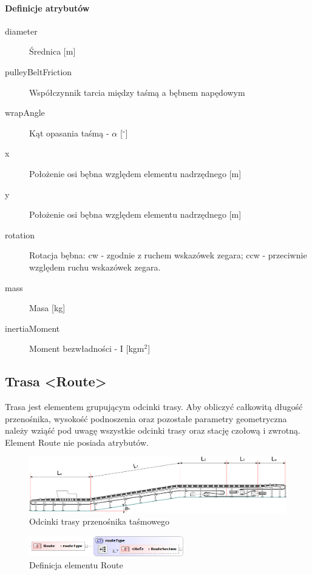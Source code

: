\documentclass[12pt,a4paper]{article}
\begin{document}
\paragraph{Definicje atrybutów}
\begin{description}
\item[diameter] Średnica [m]
\item[pulleyBeltFriction] Współczynnik tarcia między taśmą a bębnem napędowym
\item[wrapAngle] Kąt opasania taśmą - $\alpha$ [$^\circ$]
\item[x] Położenie osi bębna względem elementu nadrzędnego [m]
\item[y] Położenie osi bębna względem elementu nadrzędnego [m]
\item[rotation] Rotacja bębna: cw - zgodnie z ruchem wskazówek zegara;
	ccw - przeciwnie względem ruchu wskazówek zegara.
\item[mass] Masa [kg]
\item[inertiaMoment] Moment bezwładności - I [kgm$^2$]
\end{description}

\subsection{Trasa <Route>}
Trasa jest elementem grupującym odcinki trasy. Aby obliczyć całkowitą długość
przenośnika, wysokość podnoszenia oraz pozostałe parametry geometryczna należy
wziąść pod uwagę wszystkie odcinki trasy oraz stację czołową i zwrotną. 
Element Route nie posiada atrybutów.

\begin{figure}
  \centering
  \includegraphics[width=\textwidth]{png/belt_conveyor2_drw}
  \caption{Odcinki trasy przenośnika taśmowego}
  \label{fig:beltConveyor2-drw}
\end{figure}

\begin{figure}[h]
  \centering
  \includegraphics[width=0.6\textwidth]{png/liquid/Route}
  \caption{Definicja elementu Route}
  \label{fig:route-xsd}
\end{figure}
\end{document}
